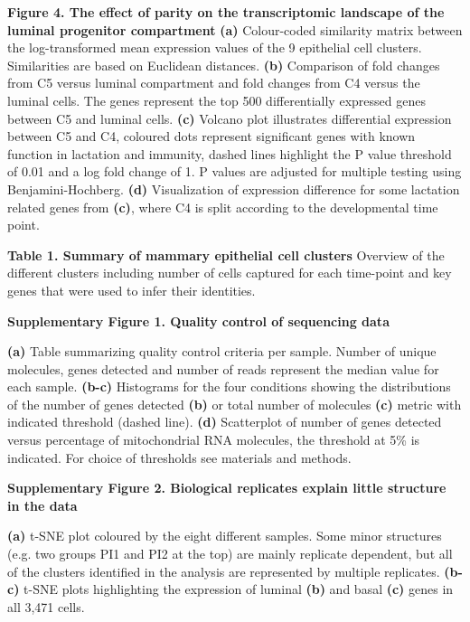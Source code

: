 \documentclass[titlepage, 12pt, oneside]{amsart}
\newcommand{\fakefigure}[1]%
{\refstepcounter{figure}\label{#1}}
\begin{document}
\textbf{Figure 4. The effect of parity on the transcriptomic landscape
of the luminal progenitor compartment}
\fakefigure{F4}
\textbf{(a)} Colour-coded similarity matrix between the log-transformed mean expression values of the 9 epithelial cell clusters.
Similarities are based on Euclidean distances.
\textbf{(b)} Comparison of fold changes from C5 versus luminal compartment and fold changes from C4 versus the luminal cells.
The genes represent the top 500 differentially expressed genes between C5 and luminal cells.
\textbf{(c)} Volcano plot illustrates differential expression between C5 and C4, coloured dots represent significant genes with known function in lactation and immunity, dashed lines highlight the P value threshold of 0.01 and a log fold change of 1.
P values are adjusted for multiple testing using Benjamini-Hochberg.
\textbf{(d)} Visualization of expression difference for some lactation related genes from \textbf{(c)}, where C4 is split according to the developmental time point.

\textbf{Table 1. Summary of mammary epithelial cell clusters}
\fakefigure{T1}
Overview of the different clusters including number of cells captured for each time-point and key genes that were used to infer their identities.

\textbf{Supplementary Figure 1. Quality control of sequencing data}

\textbf{(a)} Table summarizing quality control criteria per sample.
Number of unique molecules, genes detected and number of reads represent the median value for each sample.
\textbf{(b-c)} Histograms for the four conditions showing the distributions of the number of genes detected \textbf{(b)} or total number of molecules \textbf{(c)} metric with indicated threshold (dashed line).
\textbf{(d)} Scatterplot of number of genes detected versus percentage of mitochondrial RNA molecules, the threshold at 5\% is indicated.
For choice of thresholds see materials and methods.

\textbf{Supplementary Figure 2. Biological replicates explain little
structure in the data }

\textbf{(a)} t-SNE plot coloured by the eight different samples. Some minor structures (e.g. two groups PI1 and PI2 at the top) are mainly replicate dependent, but all of the clusters identified in the analysis are represented by multiple replicates.
\textbf{(b-c)} t-SNE plots highlighting the expression of luminal \textbf{(b)} and basal \textbf{(c)} genes in all 3,471 cells.
\end{document}
